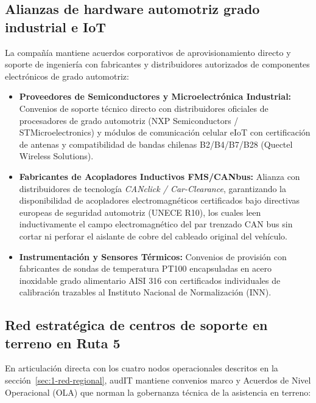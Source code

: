 \subsection{Alianzas de hardware automotriz grado industrial e IoT}\label{sec:1-alianza-hardware}

La compañía mantiene acuerdos corporativos de aprovisionamiento directo y soporte de ingeniería con fabricantes y distribuidores autorizados de componentes electrónicos de grado automotriz:

\begin{itemize}
  \item \textbf{Proveedores de Semiconductores y Microelectrónica Industrial:} Convenios de soporte técnico directo con distribuidores oficiales de procesadores de grado automotriz (NXP Semiconductors / STMicroelectronics) y módulos de comunicación celular eIoT con certificación de antenas y compatibilidad de bandas chilenas B2/B4/B7/B28 (Quectel Wireless Solutions).
  \item \textbf{Fabricantes de Acopladores Inductivos FMS/CANbus:} Alianza con distribuidores de tecnología \textit{CANclick / Car-Clearance}, garantizando la disponibilidad de acopladores electromagnéticos certificados bajo directivas europeas de seguridad automotriz (UNECE R10), los cuales leen inductivamente el campo electromagnético del par trenzado CAN bus sin cortar ni perforar el aislante de cobre del cableado original del vehículo.
  \item \textbf{Instrumentación y Sensores Térmicos:} Convenios de provisión con fabricantes de sondas de temperatura PT100 encapsuladas en acero inoxidable grado alimentario AISI 316 con certificados individuales de calibración trazables al Instituto Nacional de Normalización (INN).
\end{itemize}

\subsection{Red estratégica de centros de soporte en terreno en Ruta 5}\label{sec:1-alianza-red}

En articulación directa con los cuatro nodos operacionales descritos en la sección~\ref{sec:1-red-regional}, audIT mantiene convenios marco y Acuerdos de Nivel Operacional (OLA) que norman la gobernanza técnica de la asistencia en terreno:

